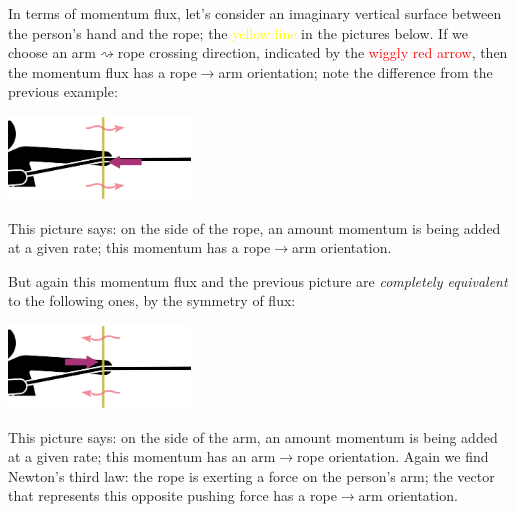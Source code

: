 \documentclass[a4paper,12pt,%
onecolumn,oneside,%
british%
]{memoir}
\renewcommand*{\|}[1][]{\nonscript\:#1\vert\nonscript\:\mathopen{}}
\begin{document}
In terms of momentum flux, let's consider an imaginary vertical surface between the person's hand and the rope; the \textcolor{yellow}{yellow line} in the pictures below. If we choose an arm$\rightsquigarrow$rope crossing direction, indicated by the \textcolor{red}{wiggly red arrow}, then the momentum flux has a rope$\rightarrow$arm orientation; note the difference from the previous example:\noprelistbreak
\begin{center}
  \includegraphics[height=6em]{images/person_pull_flux_right.pdf}
\end{center}
This picture says: on the side of the rope, an amount momentum is being added at a given rate; this momentum has a rope$\rightarrow$arm orientation.

But again this momentum flux and the previous picture are \emph{completely equivalent} to the following ones, by the symmetry of flux:\noprelistbreak
\begin{center}
  \includegraphics[height=6em]{images/person_pull_flux_left.pdf}
\end{center}
This picture says: on the side of the arm, an amount momentum is being added at a given rate; this momentum has an arm$\rightarrow$rope orientation. Again we find Newton's third law: the rope is exerting a force on the person's arm; the vector that represents this opposite pushing force has a rope$\to$arm orientation.

\medskip
\end{document}
